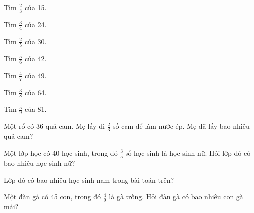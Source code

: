 \begin{ex}
Tìm $\frac{2}{3}$ của 15.
\end{ex}

\begin{ex}
Tìm $\frac{3}{4}$ của 24.
\end{ex}

\begin{ex}
Tìm $\frac{2}{5}$ của 30.
\end{ex}

\begin{ex}
Tìm $\frac{5}{6}$ của 42.
\end{ex}

\begin{ex}
Tìm $\frac{4}{7}$ của 49.
\end{ex}

\begin{ex}
Tìm $\frac{3}{8}$ của 64.
\end{ex}

\begin{ex}
Tìm $\frac{5}{9}$ của 81.
\end{ex}

\begin{ex}
Một rổ có 36 quả cam. Mẹ lấy đi $\frac{2}{3}$ số cam để làm nước ép. Mẹ đã lấy bao nhiêu quả cam?
\end{ex}

\begin{ex}
Một lớp học có 40 học sinh, trong đó $\frac{3}{5}$ số học sinh là học sinh nữ. Hỏi lớp đó có bao nhiêu học sinh nữ?
\end{ex}

\begin{ex}
Lớp đó có bao nhiêu học sinh nam trong bài toán trên?
\end{ex}

\begin{ex}
Một đàn gà có 45 con, trong đó $\frac{4}{9}$ là gà trống. Hỏi đàn gà có bao nhiêu con gà mái?
\end{ex}

